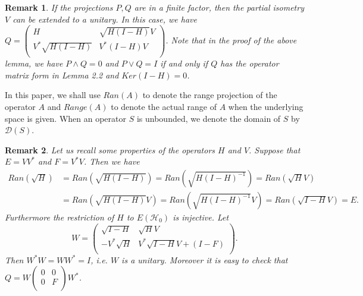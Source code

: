 \documentclass{jaums}
\theoremstyle{thmit} %
\theoremstyle{thmrm} %
\newtheorem{remark}{Remark}
\begin{document}
\begin{remark} If the projections $P,Q$ are in a finite factor, then the partial
isometry $V$ can be extended to a unitary. In this case,
we have $Q=\left(
                                                           \begin{array}{cc}
                                                             H & \sqrt{H(I-H)}V
\\
                                                             V^*\sqrt{H(I-H)} &
V^*(I-H)V \\
                                                           \end{array}
                                                         \right)$.
Note that in the proof of the above lemma, we have $P\wedge Q=0$ and $P\vee Q=I$
if and only if $Q$ has the operator matrix form in Lemma 2.2 and $Ker(I-H)=0$.
\end{remark}

In this paper, we shall use $Ran(A)$ to denote the range projection of the
operator $A$ and $Range(A)$ to denote the actual range of $A$ when the
underlying space is given. When an operator $S$ is unbounded, we denote the
domain of $S$ by $\mathcal{D}(S)$.

\begin{remark} Let us recall some properties of the operators $H$ and $V$.
Suppose that $E=VV^*$ and $F=V^*V$. Then we have
\begin{align*}
    Ran(\sqrt{H})&=Ran(\sqrt{H(I-H)})=Ran(\sqrt{H(I-H)^{-1}})=Ran(\sqrt{H}V)\\
    &=Ran(\sqrt{H(I-H)}V)=Ran(\sqrt{H(I-H)^{-1}}V)=Ran(\sqrt{I-H}V)=E.
\end{align*}
Furthermore the restriction of $H$ to $E(\mathcal{H}_0)$ is injective.
Let $$W=\left(               \begin{array}{cc}
                                        \sqrt{I-H}    & \sqrt{H}V  \\
                                        -V^*\sqrt{H}  & V^*\sqrt{I-H}V+(I-F) \\
                                       \end{array} \right).$$
Then $W^*W=WW^*=I$,  i.e. $W$ is a unitary. Moreover it is easy to check that
$Q=W\left(
\begin{array}{cc}
0 & 0 \\
0 & F \\
\end{array}
\right)W^*$.
\end{remark}
\end{document}
